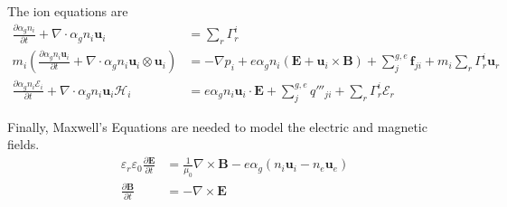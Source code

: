The ion equations are
\begin{align}
    \frac{\partial \alpha_g n_i}{\partial t} + \nabla \cdot \alpha_g n_i \mathbf{u}_i &= \sum_{r} \Gamma_r^i \\
    m_i \left(\frac{\partial \alpha_g n_i \mathbf{u}_i}{\partial t} + \nabla \cdot \alpha_g n_i \mathbf{u}_i \otimes \mathbf{u}_i \right) &= -\nabla p_i + e \alpha_g n_i (\mathbf{E} + \mathbf{u}_i \times \mathbf{B}) + \sum_j^{g,e} \mathbf{f}_{ji} + m_i\sum_r \Gamma_r^i \mathbf{u}_r \\
    \frac{\partial \alpha_g n_i \mathcal{E}_i}{\partial t} + \nabla \cdot \alpha_g n_i \mathbf{u}_i \mathcal{H}_i &= e \alpha_g n_i\mathbf{u}_i \cdot \mathbf{E} + \sum_j^{g,e} q'''_{ji} + \sum_r \Gamma_r^i \mathcal{E}_r
\end{align}

Finally, Maxwell's Equations are needed to model the electric and magnetic fields.
\begin{align}
    \varepsilon_r \varepsilon_0\frac{\partial \mathbf{E}}{\partial t} &= \frac{1}{\mu_0} \nabla \times \mathbf{B} - e\alpha_g(n_i\mathbf{u}_i - n_e\mathbf{u}_e) \\
    \frac{\partial \mathbf{B}}{\partial t} &= -\nabla \times \mathbf{E}
\end{align}



